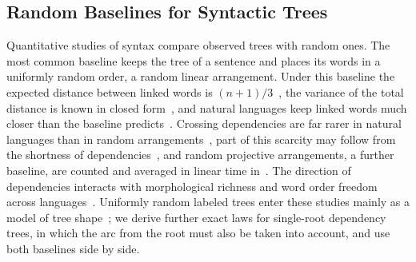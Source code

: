 \documentclass[mathematics,article,submit,pdftex,oneauthor]{Definitions/mdpi}
\begin{document}
\subsection{Random Baselines for Syntactic Trees}
Quantitative studies of syntax compare observed trees with random ones.
The most common baseline keeps the tree of a sentence and places its words in a uniformly random order, a random linear arrangement.
Under this baseline the expected distance between linked words is $(n+1)/3$~\cite{FerreriCancho2004}, the variance of the total distance is known in closed form~\cite{FerreriCancho2019}, and natural languages keep linked words much closer than the baseline predicts~\cite{FerreriCancho2022}.
Crossing dependencies are far rarer in natural languages than in random arrangements~\cite{FerreriCancho2018}, part of this scarcity may follow from the shortness of dependencies~\cite{GomezRodriguez2017}, and random projective arrangements, a further baseline, are counted and averaged in linear time in~\cite{AlemanyPuig2022}.
The direction of dependencies interacts with morphological richness and word order freedom across languages~\cite{Li2025Directionality}.
Uniformly random labeled trees enter these studies mainly as a model of tree shape~\cite{FerreriCancho2018}; we derive further exact laws for single-root dependency trees, in which the arc from the root must also be taken into account, and use both baselines side by side.
\end{document}
